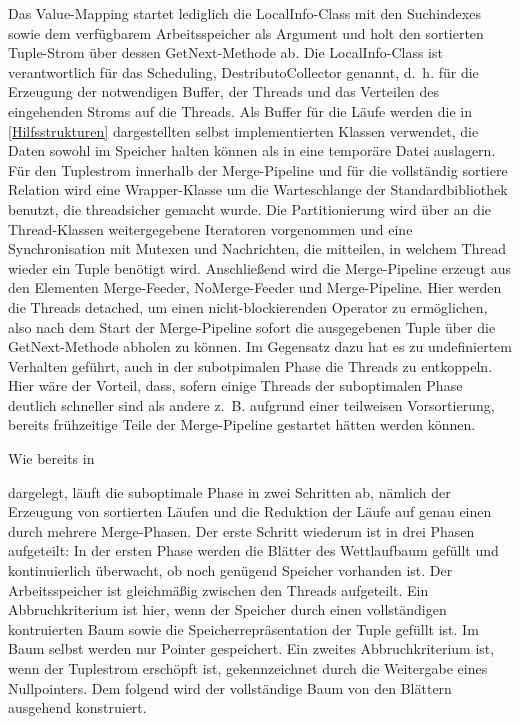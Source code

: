 \documentclass[a4paper,12pt,twoside]{article}
\begin{document}
Das Value-Mapping startet lediglich die LocalInfo-Class mit den Suchindexes sowie dem verfügbarem Arbeitsspeicher als Argument und holt den sortierten Tuple-Strom über dessen GetNext-Methode ab. Die LocalInfo-Class ist verantwortlich für das Scheduling, DestributoCollector genannt, d.~h. für die Erzeugung der notwendigen Buffer, der Threads und das Verteilen des eingehenden Stroms auf die Threads. Als Buffer für die Läufe werden die in \autoref{Hilfsstrukturen} dargestellten selbst implementierten Klassen verwendet, die Daten sowohl im Speicher halten können als in eine temporäre Datei auslagern. Für den Tuplestrom innerhalb der Merge-Pipeline und für die vollständig sortiere Relation wird eine Wrapper-Klasse um die Warteschlange der Standardbibliothek benutzt, die threadsicher gemacht wurde. Die Partitionierung wird über an die Thread-Klassen weitergegebene Iteratoren vorgenommen und eine Synchronisation mit Mutexen und Nachrichten, die mitteilen, in welchem Thread wieder ein Tuple benötigt wird. Anschließend wird die Merge-Pipeline erzeugt aus den Elementen Merge-Feeder, NoMerge-Feeder und Merge-Pipeline. Hier werden die Threads detached, um einen nicht-blockierenden Operator zu ermöglichen, also nach dem Start der Merge-Pipeline sofort die ausgegebenen Tuple über die GetNext-Methode abholen zu können. Im Gegensatz dazu hat es zu undefiniertem Verhalten geführt, auch in der subotpimalen Phase die Threads zu entkoppeln. Hier wäre der Vorteil, dass, sofern einige Threads der suboptimalen Phase deutlich schneller sind als andere z.~B. aufgrund einer teilweisen Vorsortierung, bereits frühzeitige Teile der Merge-Pipeline gestartet hätten werden können.

Wie bereits in \author{Entwicklung} dargelegt, läuft die suboptimale Phase in zwei Schritten ab, nämlich der Erzeugung von sortierten Läufen und die Reduktion der Läufe auf genau einen durch mehrere Merge-Phasen. Der erste Schritt wiederum ist in drei Phasen aufgeteilt: In der ersten Phase werden die Blätter des Wettlaufbaum gefüllt und kontinuierlich überwacht, ob noch genügend Speicher vorhanden ist. Der Arbeitsspeicher ist gleichmäßig zwischen den Threads aufgeteilt. Ein Abbruchkriterium ist hier, wenn der Speicher durch einen vollständigen kontruierten Baum sowie die Speicherrepräsentation der Tuple gefüllt ist. Im Baum selbst werden nur Pointer gespeichert. Ein zweites Abbruchkriterium ist, wenn der Tuplestrom erschöpft ist, gekennzeichnet durch die Weitergabe eines Nullpointers. Dem folgend wird der vollständige Baum von den Blättern ausgehend konstruiert.
\end{document}
